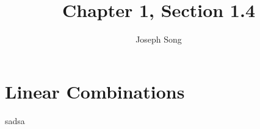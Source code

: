 \documentclass{article}
\title{Chapter 1, Section 1.4}
\author{Joseph Song}
\date{}
\begin{document}
 
 \maketitle

 \section{Linear Combinations}
 sadsa
 
 
\end{document}
